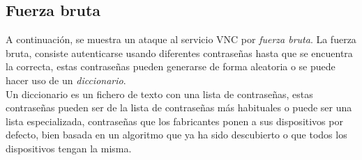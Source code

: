 \documentclass[a4,12pt,onecolum]{article}
\begin{document}

\subsection{Fuerza bruta}
A continuación, se muestra un ataque al servicio VNC por \emph{fuerza bruta}. La fuerza bruta, consiste autenticarse usando diferentes contraseñas hasta que se encuentra la correcta, estas contraseñas pueden generarse de forma aleatoria o se puede hacer uso de un \emph{diccionario}. \\

Un diccionario es un fichero de texto con una lista de contraseñas, estas contraseñas pueden ser de la lista de contraseñas más habituales o puede ser una lista especializada, contraseñas que los fabricantes ponen a sus dispositivos por defecto, bien basada en un algoritmo que ya ha sido descubierto o que todos los dispositivos tengan la misma.
\end{document}
